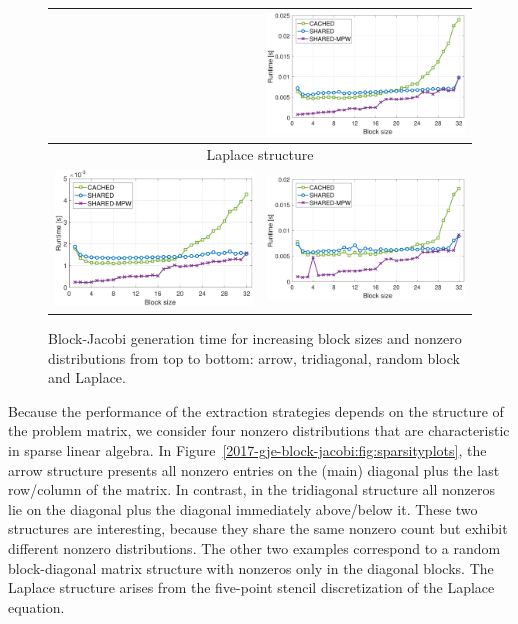 \begin{figure}
\begin{center}
{\begin{tabular}{cc}
&
\includegraphics[width=.46\columnwidth]{plots/RND_bjp_setup_bs_d_P100.pdf}\\
\hline
\multicolumn{2}{c}{Laplace structure}\\
\includegraphics[width=.46\columnwidth]{plots/LAP_bjp_setup_bs_d_K40.pdf}
&
\includegraphics[width=.46\columnwidth]{plots/LAP_bjp_setup_bs_d_P100.pdf}\\
\end{tabular}
}
\end{center}
\caption{
Block-Jacobi generation time for increasing block sizes and nonzero distributions
from top to bottom: arrow, tridiagonal, random block and Laplace.
}
\label{2017-gje-block-jacobi:fig:block-jacobi-runtime}
\end{figure}

Because the performance of the extraction strategies depends on the structure of the
problem matrix, we consider four nonzero distributions that are characteristic
in sparse linear algebra. In Figure~\ref{2017-gje-block-jacobi:fig:sparsityplots}, the arrow
	structure presents all nonzero entries on the (main) diagonal plus the last
row/column of the matrix. In contrast, in the tridiagonal structure all
nonzeros lie on the diagonal plus the diagonal immediately above/below it. These
two structures are interesting, because they share the same nonzero count but exhibit
different nonzero distributions. The other two examples correspond to a 
random block-diagonal matrix structure with nonzeros only in the
diagonal blocks. The Laplace structure arises from the five-point
stencil discretization of the Laplace equation.

